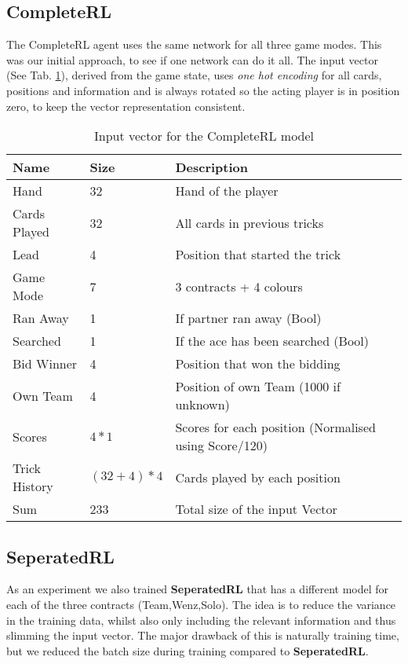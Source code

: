 {\subsection{CompleteRL}
The CompleteRL agent uses the same network for all three game modes.
This was our initial approach, to see if one network can do it all.
The input vector (See Tab. \ref{tab:completerlinput}), derived from the game state, uses \textit{one hot encoding}
for all cards, positions and information and is always rotated so the acting player is in position zero, to keep the
vector representation
consistent.\\
\begin{table}[!h]
\centering
\begin{tabular}{lll}
\toprule
Name          & Size     & Description                                           \\
\midrule
Hand          & 32       & Hand of the player                                    \\
Cards Played  & 32       & All cards in previous tricks                          \\
Lead          & 4        & Position that started the trick                       \\
Game Mode     & 7        & 3 contracts + 4 colours                               \\
Ran Away      & 1        & If partner ran away (Bool)                            \\
Searched      & 1        & If the ace has been searched (Bool)                   \\
Bid Winner    & 4        & Position that won the bidding                         \\
Own Team      & 4        & Position of own Team (1000 if unknown)                \\
Scores        & \(4*1\)      & Scores for each position (Normalised using Score/120) \\
Trick History & \((32+4)*4\) & Cards played by each position                        \\
\midrule
Sum & 233 & Total size of the input Vector\\
\bottomrule
\end{tabular}
\label{tab:completerlinput}
\caption{Input vector for the CompleteRL model}

\end{table}

\subsection{SeperatedRL}
As an experiment we also trained \textbf{SeperatedRL} that has a different model for each of the three contracts
(Team,Wenz,Solo).
The idea is to reduce the variance in the training data, whilst also only including the relevant information and thus
slimming the input vector.
The major drawback of this is naturally training time, but we reduced the batch size during training compared to
\textbf{SeperatedRL}.

}
